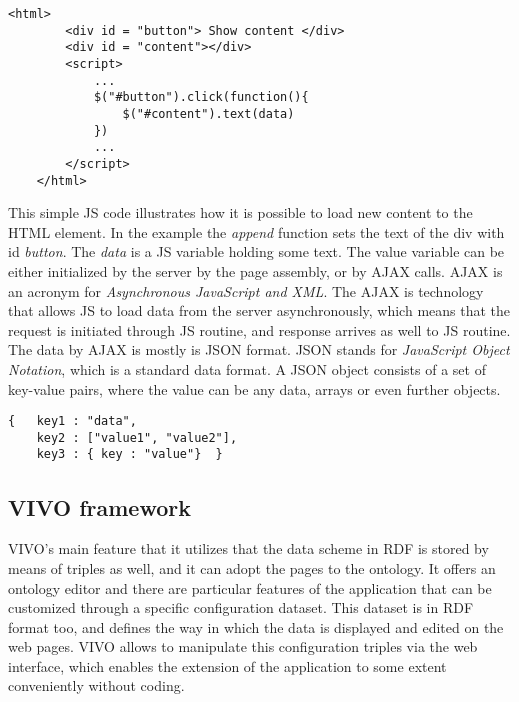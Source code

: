 \begin{lstlisting}[captionpos=b, caption=JavaScript routine assigned to an HTML element, label=jsListing, belowskip=1em, aboveskip=2em,
basicstyle=\footnotesize,frame=single]
	<html>
		<div id = "button"> Show content </div>
		<div id = "content"></div>
		<script>
			...
			$("#button").click(function(){
				$("#content").text(data)
			})
			...	
		</script>
	</html>
\end{lstlisting}

This simple JS code illustrates how it is possible to load new content to the HTML element. In the example the \textit{append} function sets the text of the div with id \textit{button}. The \textit{data} is a JS variable holding
some text. The value variable can be either initialized by the server by the page assembly, or by AJAX calls. AJAX is an acronym for \textit{Asynchronous JavaScript and XML}. The AJAX is technology that allows JS to load data from the server asynchronously, which means that the request is initiated through JS routine, and response arrives as well to JS routine. The data by AJAX is mostly is JSON format. JSON stands for \textit{JavaScript Object Notation}, which is a standard data format. A JSON object consists of a set of key-value pairs, where the value can be any data, arrays or even further objects.

\begin{lstlisting}[captionpos=b, caption=JSON object example, label=jsListing, belowskip=1em, aboveskip=2em,
basicstyle=\footnotesize,frame=single]
{	key1 : "data",
	key2 : ["value1", "value2"],
	key3 : { key : "value"}  }
\end{lstlisting}


\subsection{VIVO framework} \label{vivo}

VIVO's main feature that it utilizes that the data scheme in RDF is stored by means of triples as well, and it can adopt the pages to the ontology. It offers an ontology editor and there are particular features of the application that can be customized through a specific configuration dataset. This dataset is in RDF format too, and defines the way in which the data is displayed and edited on the web pages. VIVO allows to manipulate this configuration triples via the web interface, which enables the extension of the application to some extent conveniently without coding.

